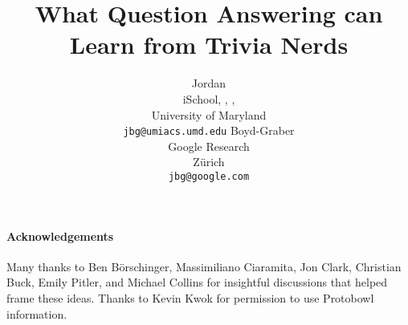 \documentclass[table,times]{article}
\title{What Question Answering can Learn from Trivia Nerds}
\author{\hspace{4.4cm}Jordan \\ 
iSchool, \abr{cs}, \abr{umiacs}, \abr{lsc} \\
University of Maryland \\
\texttt{jbg@umiacs.umd.edu} \And 
\hspace{-5.2cm} Boyd-Graber \\
Google Research \\
Z\"urich \\
\texttt{jbg@google.com}}
\newcommand{\latexfile}[1]{}
\begin{document}
\maketitle

\latexfile{00-abstract}
\latexfile{10-intro}
\latexfile{20-tournaments}
\latexfile{30-craft}

\latexfile{60-qb}
\latexfile{90-call}

\paragraph{Acknowledgements}

Many thanks to Ben B\"orschinger, Massimiliano Ciaramita, Jon Clark, Christian Buck, Emily Pitler, and Michael Collins for insightful discussions that helped frame these ideas.  Thanks to Kevin Kwok for permission to use Protobowl information.



\end{document}
